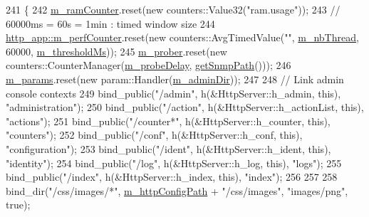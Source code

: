 \begin{DoxyCode}
241 \{
242   \hyperlink{classxtd_1_1servers_1_1app_1_1HttpServer_a0758f122d486bc068d796d4ce550e99f}{m\_ramCounter}.reset(\textcolor{keyword}{new} counters::Value32(\textcolor{stringliteral}{"ram.usage"}));
243   \textcolor{comment}{// 60000ms = 60s = 1min : timed window size}
244   \hyperlink{classxtd_1_1servers_1_1app_1_1HttpServer_afc57d4c9bc2f9a47440e3c54eb92b1fb}{http\_app::m\_perfCounter}.reset(\textcolor{keyword}{new} counters::AvgTimedValue(\textcolor{stringliteral}{""}, 
      \hyperlink{classxtd_1_1servers_1_1app_1_1HttpServer_a2f0812d24ccfd55e943f3144c672b473}{m\_nbThread}, 60000, \hyperlink{classxtd_1_1servers_1_1app_1_1HttpServer_ad7f8a9a0475e17154850c3d575bf6f05}{m\_thresholdMs}));
245   \hyperlink{classxtd_1_1servers_1_1app_1_1HttpServer_aa26ddc958ab07774e8ba45e89dc0011b}{m\_prober}.reset(\textcolor{keyword}{new} counters::CounterManager(\hyperlink{classxtd_1_1servers_1_1app_1_1HttpServer_a87fc30b2e7e6ab2aabc2c46c884d7f17}{m\_probeDelay}, 
      \hyperlink{classxtd_1_1servers_1_1app_1_1HttpServer_affc53261a7c36873c73a06013d6b1fe6}{getSnmpPath}()));
246   \hyperlink{classxtd_1_1servers_1_1app_1_1HttpServer_ac4f9a2c40867f4f2ba8d30ec9876e51e}{m\_params}.reset(\textcolor{keyword}{new} param::Handler(\hyperlink{classxtd_1_1servers_1_1app_1_1HttpServer_ad12543f950574ac8a0d813cb4ceeff4c}{m\_adminDir}));
247 
248   \textcolor{comment}{// Link admin console contexts}
249   bind\_public(\textcolor{stringliteral}{"/admin"},    h(&HttpServer::h\_admin,      \textcolor{keyword}{this}), \textcolor{stringliteral}{"administration"});
250   bind\_public(\textcolor{stringliteral}{"/action"},   h(&HttpServer::h\_actionList, \textcolor{keyword}{this}), \textcolor{stringliteral}{"actions"});
251   bind\_public(\textcolor{stringliteral}{"/counter*"}, h(&HttpServer::h\_counter,    \textcolor{keyword}{this}), \textcolor{stringliteral}{"counters"});
252   bind\_public(\textcolor{stringliteral}{"/conf"},     h(&HttpServer::h\_conf,       \textcolor{keyword}{this}), \textcolor{stringliteral}{"configuration"});
253   bind\_public(\textcolor{stringliteral}{"/ident"},    h(&HttpServer::h\_ident,      \textcolor{keyword}{this}), \textcolor{stringliteral}{"identity"});
254   bind\_public(\textcolor{stringliteral}{"/log"},      h(&HttpServer::h\_log,        \textcolor{keyword}{this}), \textcolor{stringliteral}{"logs"});
255   bind\_public(\textcolor{stringliteral}{"/index"},    h(&HttpServer::h\_index,      \textcolor{keyword}{this}), \textcolor{stringliteral}{"index"});
256 
257 
258   bind\_dir(\textcolor{stringliteral}{"/css/images/*"}, \hyperlink{classxtd_1_1servers_1_1app_1_1HttpServer_abfb9586e84fa5149da3226eeea39980f}{m\_httpConfigPath} + \textcolor{stringliteral}{"/css/images"}, \textcolor{stringliteral}{"images/png"},      \textcolor{keyword}{true});

\end{DoxyCode}
